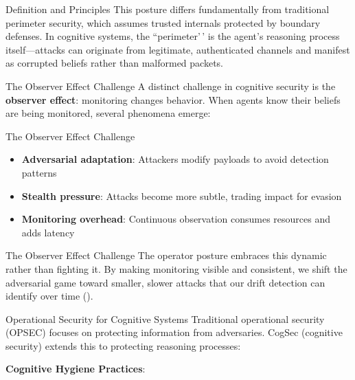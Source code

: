 \documentclass[
  ignorenonframetext,
]{beamer}
\providecommand{\cref}[1]{\texttt{\detokenize{#1}}}
\begin{document}
\begin{frame}[allowframebreaks]{Definition and Principles}
This posture differs fundamentally from traditional perimeter security,
which assumes trusted internals protected by boundary defenses. In
cognitive systems, the ``perimeter'\,' is the agent's reasoning process
itself---attacks can originate from legitimate, authenticated channels
and manifest as corrupted beliefs rather than malformed packets.
\end{frame}

\begin{frame}[allowframebreaks]{The Observer Effect Challenge}
\protect{}\label{the-observer-effect-challenge}
A distinct challenge in cognitive security is the
\textbf{observer effect}: monitoring changes behavior. When agents know
their beliefs are being monitored, several phenomena emerge:

\end{frame}

\begin{frame}[allowframebreaks]{The Observer Effect Challenge}
\begin{itemize}
\item \textbf{Adversarial adaptation}: Attackers modify payloads to avoid detection patterns
\item \textbf{Stealth pressure}: Attacks become more subtle, trading impact for evasion
\item \textbf{Monitoring overhead}: Continuous observation consumes resources and adds latency
\end{itemize}

\end{frame}

\begin{frame}[allowframebreaks]{The Observer Effect Challenge}
The operator posture embraces this dynamic rather than fighting it. By
making monitoring visible and consistent, we shift the adversarial game
toward smaller, slower attacks that our drift detection can identify
over time (\cref{sec:runtime-defenses}).
\end{frame}

\begin{frame}[allowframebreaks]{Operational Security for Cognitive
Systems}
\protect{}\label{operational-security-for-cognitive-systems}
Traditional operational security (OPSEC) focuses on protecting
information from adversaries. CogSec (cognitive security) extends this
to protecting reasoning processes:

\textbf{Cognitive Hygiene Practices}:

\end{frame}
\end{document}
